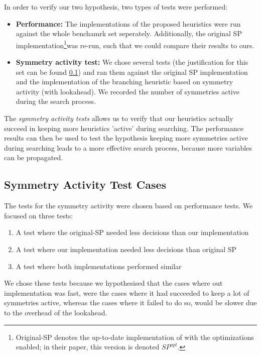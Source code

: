 
In order to verify our two hypothesis, two types of tests were performed:

\begin{itemize}
	\item {\bf Performance:}
		The implementations of the proposed heuristics were run against the whole
		benchamrk set seperately.
		Additionally, the original SP implementation\footnote{
			Original-SP denotes the up-to-date implementation of \cite{devriendt2012symmetry} with
			the optimizations enabled; in their paper, this version is denoted $SP^{opt}$.
		}was re-run, such that we could compare their
		results to ours.

	\item {\bf Symmetry activity test:}
		We chose several tests (the justification for this set can be found
		\ref{ssec:sym_act_test_cases}) and ran them against the original SP implementation and the
		implementation of the branching heuristic based on symmetry activity (with lookahead).
		We recorded the number of symmetries active during the search process.

\end{itemize}

The \emph{symmetry activity tests} allows us to verify that our heuristics actually succeed in
keeping more heuristics 'active' during searching.
The performance results can then be used to test the hypothesis
keeping more symmetries active during searching leads to a more effective search process,
because more variables can be propagated.

\subsection{Symmetry Activity Test Cases}
\label{ssec:sym_act_test_cases}
	The tests for the symmetry activity were chosen based on performance tests.
	We focused on three tests:
	\begin{enumerate}
		\item A test where the original-SP needed less decisions than our implementation
		\item A test where our implementation needed less decisions than original SP
		\item A test where both implementations performed similar
	\end{enumerate}

	We chose these tests because we hypothesised that the cases where out implementation was fast,
	were the cases where it had succeeded to keep a lot of symmetries active,
	whereas the cases where it failed to do so, would be slower due to the overhead of the lookahead.

